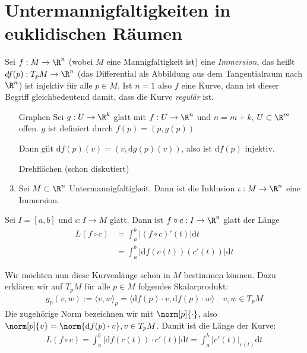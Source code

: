 \renewcommand{\d}{\ensuremath{\mathrm d}}

\section{Untermannigfaltigkeiten in euklidischen Räumen}

\begin{dfn}
Sei $f : M \to \R^n$ (wobei $M$ eine Mannigfaltigkeit ist) eine
\emph{Immersion}, das heißt $df(p) : T_p M \to \R^n$ (das Differential als
Abbildung aus dem Tangentialraum nach $\R^n$) ist injektiv für alle $p\in M$.
Ist $n=1$ also $f$ eine Kurve, dann ist dieser Begriff gleichbedeutend damit,
dass die Kurve \emph{regulär} ist.

\begin{bsp}
  \begin{enumerate}
    \item[Graphen] Sei $g: U \to \R^k$ glatt mit $f:U\to\R^n$ und $n = m + k$,
      $U\subset \R^m$ offen. $g$ ist definiert durch $f(p) = (p,g(p))$

      Dann gilt $\d f(p)(v) = (v, \d g(p)(v))$, also ist $\d f(p)$ injektiv.
    \item[Drehflächen] (schon diskutiert)
    \item Sei $M\subset\R^n$ Untermannigfaltigkeit. Dann ist die Inklusion
      $\iota : M \to \R^n$ eine Immersion.
  \end{enumerate}
\end{bsp}
\end{dfn}

Sei $I = [a,b]$ und $c : I \to M$ glatt. Dann ist $f\circ c : I \to \R^n$ glatt
der Länge
\begin{align}
  L(f\circ c) &= \int_a^b\left|(f\circ c)'(t)\right| \d t \\
              &= \int_a^b\left|\d f(c(t))(c'(t))\right| \d t
\end{align}


Wir möchten nun diese Kurvenlänge schon in $M$ bestimmen können. Dazu erklären
wir auf $T_pM$ für alle $p\in M$ folgendes Skalarprodukt:
\begin{align}
  g_p(v, w) := \langle v,w\rangle_p = \langle \d f(p)\cdot v, \d
  f(p) \cdot w\rangle \quad v,w \in T_pM
\end{align}
Die zugehörige Norm bezeichnen wir mit $\norm[p]{\cdot}$, also
$\norm[p]{v} = \norm{\d f(p)\cdot v}, v\in T_p M$. Damit ist die
Länge der Kurve:
\begin{align}
  L(f\circ c) = \int_a^b\left|\d f(c(t))\cdot c'(t)\right|\d t =
  \int_a^b\left|c'(t)\right|_{c(t)}\d t
\end{align}

